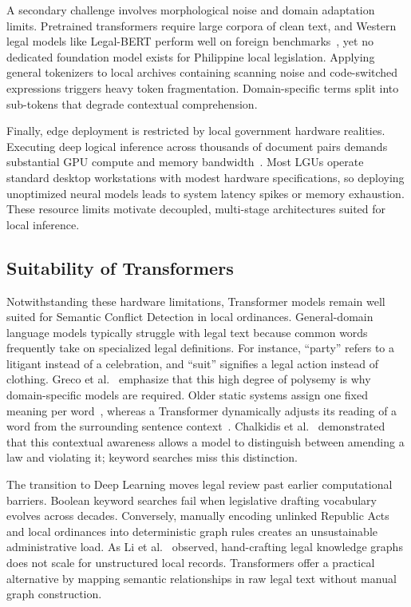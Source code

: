     A secondary challenge involves morphological noise and domain adaptation limits. Pretrained transformers require large corpora of clean text, and Western legal models like Legal-BERT perform well on foreign benchmarks~\cite{chalkidis2020legal}, yet no dedicated foundation model exists for Philippine local legislation. Applying general tokenizers to local archives containing scanning noise and code-switched expressions triggers heavy token fragmentation. Domain-specific terms split into sub-tokens that degrade contextual comprehension.

    Finally, edge deployment is restricted by local government hardware realities. Executing deep logical inference across thousands of document pairs demands substantial GPU compute and memory bandwidth~\cite{reimers2019sentencebert}. Most LGUs operate standard desktop workstations with modest hardware specifications, so deploying unoptimized neural models leads to system latency spikes or memory exhaustion. These resource limits motivate decoupled, multi-stage architectures suited for local inference.

    \subsection{Suitability of Transformers}
    Notwithstanding these hardware limitations, Transformer models remain well suited for Semantic Conflict Detection in local ordinances. General-domain language models typically struggle with legal text because common words frequently take on specialized legal definitions. For instance, ``party'' refers to a litigant instead of a celebration, and ``suit'' signifies a legal action instead of clothing. Greco et al.~\cite{Greco2023Bringing} emphasize that this high degree of polysemy is why domain-specific models are required. Older static systems assign one fixed meaning per word~\cite{Greco2023Bringing}, whereas a Transformer dynamically adjusts its reading of a word from the surrounding sentence context~\cite{chalkidis2020legal}. Chalkidis et al.~\cite{chalkidis2019large} demonstrated that this contextual awareness allows a model to distinguish between amending a law and violating it; keyword searches miss this distinction.

    The transition to Deep Learning moves legal review past earlier computational barriers. Boolean keyword searches fail when legislative drafting vocabulary evolves across decades. Conversely, manually encoding unlinked Republic Acts and local ordinances into deterministic graph rules creates an unsustainable administrative load. As Li et al.~\cite{li2024construction} observed, hand-crafting legal knowledge graphs does not scale for unstructured local records. Transformers offer a practical alternative by mapping semantic relationships in raw legal text without manual graph construction.

